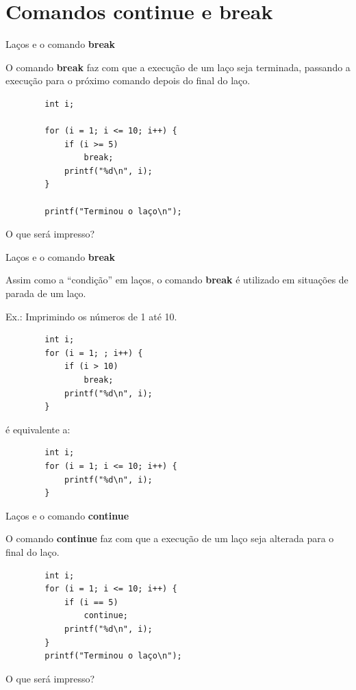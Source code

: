 \documentclass[handout]{beamer}
\begin{document}
\section{Comandos {\bf continue} e {\bf break}}%

\begin{frame}[fragile]{Laços e o comando {\bf break}}

    O comando {\bf break} faz com que a execução de um laço seja terminada, passando a execução para o próximo comando depois do final do laço.

    \begin{verbatim}
        int i;

        for (i = 1; i <= 10; i++) {
            if (i >= 5)
                break;
            printf("%d\n", i);
        }

        printf("Terminou o laço\n");
    \end{verbatim}

    O que será impresso?
\end{frame}

\begin{frame}[fragile]{Laços e o comando {\bf break}}

    Assim como a ``condição'' em laços, o comando {\bf break} é utilizado em situações de parada de um laço.

    Ex.: Imprimindo os números de 1 até 10.

    \begin{verbatim}
        int i;
        for (i = 1; ; i++) {
            if (i > 10)
                break;
            printf("%d\n", i);
        }
    \end{verbatim}

    é equivalente a:

    \begin{verbatim}
        int i;
        for (i = 1; i <= 10; i++) {
            printf("%d\n", i);
        }
    \end{verbatim}
\end{frame}

\begin{frame}[fragile]{Laços e o comando {\bf continue}}

    O comando {\bf continue} faz com que a execução de um laço seja alterada para o final do laço.

    \begin{verbatim}
        int i;
        for (i = 1; i <= 10; i++) {
            if (i == 5)
                continue;
            printf("%d\n", i);
        }
        printf("Terminou o laço\n");
    \end{verbatim}

    O que será impresso?
\end{frame}
\end{document}
